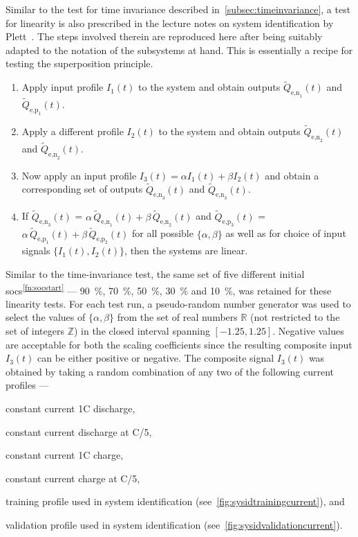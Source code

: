 Similar     to      the     test      for     time      invariance     described
in~\cref{subsec:timeinvariance}, a  test for linearity is  also prescribed in
the lecture notes on  system identification by Plett~\cite{PlettECE5560_02}. The
steps involved therein  are reproduced here after being suitably  adapted to the
notation of the subsystems at hand. This is essentially a recipe for testing the
superposition principle.
\begin{enumerate}
    \item Apply input profile $I_1(t)$ to the system and obtain outputs $\widetilde{Q}_{\text{e,n}_1}\!(t)$ and $\widetilde{Q}_{\text{e,p}_1}\!(t)$.
    \item Apply a different profile $I_2(t)$ to the system and obtain outputs $\widetilde{Q}_{\text{e,n}_2}\!(t)$ and $\widetilde{Q}_{\text{e,n}_2}\!(t)$.
    \item Now apply an input profile $I_3(t) = \alpha I_1(t) + \beta I_2(t)$ and obtain a corresponding set of outputs $\widetilde{Q}_{\text{e,n}_3}\!(t)$ and $\widetilde{Q}_{\text{e,n}_3}\!(t)$.
    \item If $\widetilde{Q}_{\text{e,n}_3}\!(t)$ = $\alpha\, \widetilde{Q}_{\text{e,n}_1}\!(t) + \beta \, \widetilde{Q}_{\text{e,n}_2}\!(t)$ and $\widetilde{Q}_{\text{e,p}_3}\!(t)$ = $\alpha\, \widetilde{Q}_{\text{e,p}_1}\!(t) + \beta \, \widetilde{Q}_{\text{e,p}_2}\!(t)$ for all possible $\{\alpha,\beta\}$ as well as for choice of input signals $\{I_1(t),I_2(t)\}$, then the systems are linear.
\end{enumerate}

Similar  to   the  time-invariance  test,   the  same  set  of   five  different
initial  \glspl{soc}\textsuperscript{\ref{fn:socstart}}  ---  \SI{90}{\percent},
\SI{70}{\percent},  \SI{50}{\percent}, \SI{30}{\percent}  and \SI{10}{\percent},
was  retained for  these linearity  tests. For  each test  run, a  pseudo-random
number generator  was used to select  the values of $\{\alpha,\beta\}$  from the
set  of  real numbers  $\mathbb{R}$  (not  restricted  to  the set  of  integers
$\mathbb{Z}$) in  the closed  interval spanning $[-1.25,1.25]$.  Negative values
are acceptable for  both the scaling coefficients since  the resulting composite
input $I_3(t)$ can be either positive or negative. The composite signal $I_3(t)$
was obtained by taking a random combination  of any two of the following current
profiles ---
\begin{enumerate*}[label=\emph{\alph*})]
    \item constant current 1C discharge,
    \item constant current discharge at C/5,
    \item constant current 1C charge,
    \item constant current charge at C/5,
    \item training profile used in system identification (see~\cref{fig:sysidtrainingcurrent}), and
    \item validation profile used in system identification (see~\cref{fig:sysidvalidationcurrent}).
\end{enumerate*}


